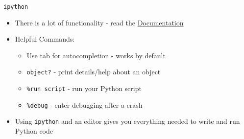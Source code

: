 \documentclass[11pt,professionalfonts]{beamer}
\begin{document}
\begin{frame}{\texttt{ipython}}
    \begin{itemize}
    \item There is a lot of functionality - read the \href{http://ipython.readthedocs.io/en/stable/}{Documentation}
    \item Helpful Commands:
        \begin{itemize}
            \item Use tab for autocompletion - works by default
            \item \texttt{object?} - print details/help about an object
            \item \texttt{\%run script} - run your Python script
            \item \texttt{\%debug} - enter debugging after a crash
        \end{itemize}
    \item Using \texttt{ipython} and an editor gives you everything needed to write and run Python code
\end{itemize}
\end{frame}
\end{document}
